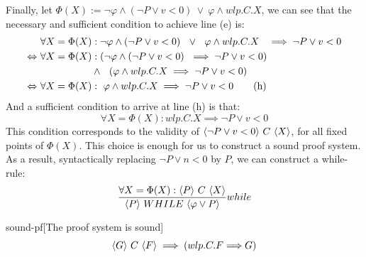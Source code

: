 Finally, let $\Phi(X):=\neg\varphi\wedge (\neg P\vee v< 0) \ \vee\  \varphi\wedge wlp.C.X$, 
we can see that the necessary and sufficient condition to achieve line (e) is: 
\begin{align*}
	& \forall X=\Phi(X):\neg\varphi\wedge (\neg P\vee v< 0) \ \ \vee\ \  \varphi\wedge wlp.C.X  \ \ \implies \neg P\vee v< 0 \\ 
	\iff \ & \forall X=\Phi(X):(\neg\varphi\wedge (\neg P\vee v< 0) \ \implies \neg P\vee v< 0) \\ 
	& \hspace{.15\linewidth} \wedge\ \  (\varphi\wedge wlp.C.X \implies \neg P\vee v< 0)  \\ 
	\iff \ &\forall X=\Phi(X): \  \varphi\wedge wlp.C.X \implies \neg P\vee v< 0  \tag{h}\\ 
\end{align*}
And a sufficient condition to arrive at line (h) is that:
$$\forall X=\Phi(X):  wlp.C.X \implies \neg P\vee v< 0 $$
This condition corresponds to the validity of $\langle \neg P\vee v< 0 \rangle\ C\ \langle X \rangle$, for all fixed points of $\Phi(X)$. 
This choice is enough for us to construct a sound proof system.%
As a result, syntactically replacing $\neg P\vee n<0$ by $P$, we can construct a while-rule: 
$$\displaystyle\frac{\forall X=\Phi(X):\langle P \rangle\ C\ \langle X \rangle}{\langle P \rangle\ WHILE\ \langle \varphi\vee P \rangle} while$$

\begin{lemma}{sound-pf}[The proof system is sound]
	\ \\
	$$\langle G \rangle\ C\ \langle F \rangle\implies (wlp.C.F{\implies} G)$$
\end{lemma}

